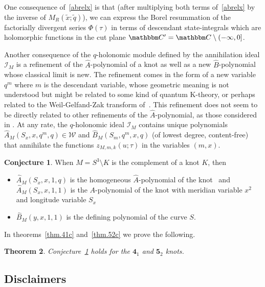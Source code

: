 \documentclass[12pt,reqno]{amsart}
\newtheorem{theorem}{Theorem}
\theoremstyle{definition}
\newtheorem{conjecture}[theorem]{Conjecture}
\def\BC{\mathbbm C}
\def\calI{\mathcal I}
\def\calI{\mathcal I}
\def\calW{\mathcal W}
\def\tq{\tilde{q}}
\def\tx{\tilde{x}}
\def\tx{\tilde{x}}
\def\Ahat{\widehat{A}}
\def\Bhat{\widehat{B}}
\def\md{\mathbf}
\newcommand{\knot}[1]{\md{#1}}
\begin{document}
One consequence of~\eqref{abrelx} is that (after multiplying both
terms of~\eqref{abrelx} by the inverse of $M_R(\tx;\tq)$), we can
express the Borel resummation of the factorially divergent series
$\Phi(\tau)$ in terms of descendant state-integrals which are
holomorphic functions in the cut plane
$\BC'=\BC\setminus (-\infty,0]$.

Another consequence of the $q$-holonomic module defined by the
annihilation ideal $\calI_M$ is a refinement of the $\Ahat$-polynomial
of a knot as well as a new $\Bhat$-polynomial whose classical limit is
new.  The refinement comes in the form of a new variable $q^m$ where
$m$ is the descendant variable, whose geometric meaning is not
understood but might be related to some kind of quantum K-theory, or
perhaps related to the Weil-Gelfand-Zak transform of~\cite{AK:new}.
This refinement does not seem to be directly related to other refinements
of the $\Ahat$-polynomial, as those considered in
\cite{av-knots,super,GLL:HOMFLY}. At any rate, the $q$-holonomic ideal
$\calI_M$ contains unique
polynomials $\Ahat_M(S_x,x,q^m,q) \in \calW$ and $\Bhat_M(S_m,q^m,x,q)$
(of lowest degree, content-free) that annihilate the functions
$z_{M,m,k}(u;\tau)$ in the variables $(m,x)$.

\begin{conjecture}
  \label{conj.ann}
  When $M=S^3\setminus K$ is the complement of a knot $K$, then
  \begin{itemize}
  \item[(a)] $\Ahat_M(S_x,x,1,q)$ is the homogeneous
    $\Ahat$-polynomial of the knot~\cite{Ga:AJ} and
    $\Ahat_M(S_x,x,1,1)$ is the $A$-polynomial of the knot with
    meridian variable $x^2$ and longitude variable $S_x$~\cite{CCGLS}
  \item[(b)] $\Bhat_M(y,x,1,1)$ is the defining polynomial of the curve
    $S$.
  \end{itemize}
\end{conjecture}

In theorems~\ref{thm.41c} and~\ref{thm.52c} we prove the following.

\begin{theorem}
  \label{thm.4152ann}
  Conjecture~\ref{conj.ann} holds for the $\knot{4}_1$ and
  $\knot{5}_2$ knots.
\end{theorem}

\subsection{Disclaimers}
\label{sub.disclaimers}
\end{document}
